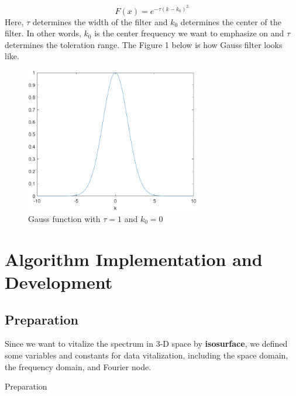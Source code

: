 \documentclass{article}
\begin{document}
\begin{equation}
    F(x) = e^{-\tau(k-k_0)^2}
\end{equation}
Here, $\tau$ determines the width of the filter and $k_0$ determines the center of the filter. In other words, $k_0$ is the center frequency we want to emphasize on and $\tau$ determines the toleration range. The Figure 1 below is how Gauss filter looks like.
\begin{figure}[h]
    \centerline{\includegraphics[width=3in]{gauss.png}}
    \caption{Gauss function with $\tau=1$ and $k_0=0$}
\end{figure}
\section{Algorithm Implementation and Development}
\subsection{Preparation}
Since we want to vitalize the spectrum in 3-D space by \textbf{isosurface}, we defined some variables and constants for data vitalization, including the space domain, the frequency domain, and Fourier node.

\begin{algorithm}
\begin{algorithmic}
\end{algorithmic}
\caption{Preparation}
\end{algorithm}

\newpage
\end{document}
